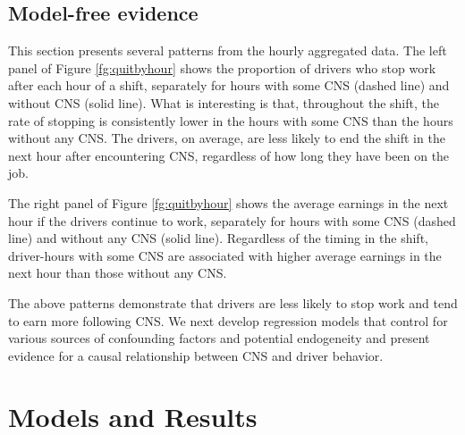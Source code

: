 \documentclass[reviewmode,AEJ]{AEA}
\begin{document}
\subsection{Model-free evidence}
This section presents several patterns from the hourly aggregated data. %
The left panel of Figure \ref{fg:quitbyhour}
shows the proportion of drivers who stop work after each hour of a shift, separately for
hours with some CNS (dashed line) and without CNS (solid line).
What is interesting is that, throughout the shift, the rate of stopping is consistently lower in the hours with some CNS than the hours without any CNS. The drivers, on average, are less likely to end the shift in the next hour after encountering CNS, regardless of how long they have been on the job.

The right panel of Figure \ref{fg:quitbyhour} shows the average earnings in the next hour if the drivers continue to work, separately for hours with some CNS (dashed line) and without any CNS (solid line).
Regardless of the timing in the shift, driver-hours with some CNS are associated with higher average earnings in the next hour than those without any CNS.


The above patterns demonstrate %
that drivers are less likely to stop work and tend to earn more following CNS. %
We next develop regression models that control for various sources of confounding factors and
potential endogeneity and present evidence for a causal relationship between CNS and driver behavior.

\section{Models and Results}
\label{sec:main}
\end{document}

